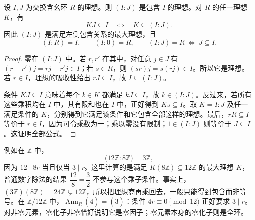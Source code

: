 \begin{proposition}\label{b1:prop:ideal-quotient-rules}
	设 \(I,J\) 为交换含幺环 \(R\) 的理想。则 \((I:J)\) 是包含 \(I\) 的理想。对 \(R\) 的任一理想 \(K\)，有
	\begin{equation}\label{b1:eq:ideal-quotient-adjunction}
		KJ\subseteq I\quad\Longleftrightarrow\quad K\subseteq(I:J).
	\end{equation}
	因此 \((I:J)\) 是满足左侧包含关系的最大理想，且
	\[
		(I:R)=I,\qquad (I:0)=R,\qquad (I:J)=R\ \Longleftrightarrow\ J\subseteq I.
	\]
\end{proposition}
\begin{proof}
	零在 \((I:J)\) 中。若 \(r,r'\) 在其中，对任意 \(j\in J\) 有 \((r-r')j=rj-r'j\in I\)；若 \(s\in R\)，则 \((sr)j=s(rj)\in I\)。所以它是理想。若 \(r\in I\)，理想的吸收性给出 \(rJ\subseteq I\)，故 \(I\subseteq(I:J)\)。

	条件 \(KJ\subseteq I\) 意味着每个 \(k\in K\) 都满足 \(kJ\subseteq I\)，故 \(k\in(I:J)\)。反过来，若所有这些乘积均在 \(I\) 中，其有限和也在 \(I\) 中，正好得到 \(KJ\subseteq I\)。取 \(K=I:J\) 及任一满足条件的 \(K\)，分别得到它满足该条件和它包含全部这样的理想。最后，\(rR\subseteq I\) 等价于 \(r\in I\)，因为可令乘数为一；乘以零没有限制；\(1\in(I:J)\) 则等价于 \(J\subseteq I\)。这证明全部公式。
\end{proof}
例如在 \(\mathbb Z\) 中，
\[
	\bigl(12\mathbb Z:8\mathbb Z\bigr)=3\mathbb Z,
\]
因为 \(12\mid8r\) 当且仅当 \(3\mid r\)。这里计算的是满足 \(K(8\mathbb Z)\subseteq12\mathbb Z\) 的最大理想 \(K\)，普通数字除法的结果 \(\dfrac{12}{8}=\dfrac32\) 不参与这个乘子条件。事实上，\((3\mathbb Z)(8\mathbb Z)=24\mathbb Z\subsetneq12\mathbb Z\)，所以把理想商再乘回去，一般只能得到包含而非等号。在 \(\mathbb Z/12\mathbb Z\) 中，\(\operatorname{Ann}_R(\bar4)=(\bar3)\)：条件 \(4r\equiv0\pmod{12}\) 正好要求 \(3\mid r\)。对非零元素，零化子非零恰好说明它是零因子；零元素本身的零化子则是全环。

